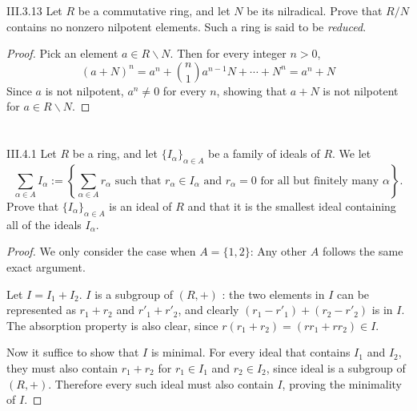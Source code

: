 \begin{problem}{III.3.13}
Let $R$ be a commutative ring, and let $N$ be its nilradical. Prove that $R/N$ contains no nonzero nilpotent elements. Such a ring is said to be \emph{reduced}.
\end{problem}
\begin{proof}
Pick an element $a \in R \backslash N$. Then for every integer $n > 0$,
\[
(a + N)^n = a^n + \binom{n}{1} a^{n-1} N + \cdots + N^n = a^n + N
\]
Since $a$ is not nilpotent, $a^n \neq 0$ for every $n$, showing that $a + N$ is not nilpotent for $a \in R \backslash N$.
\end{proof}

\section{}
\begin{problem}{III.4.1}
Let $R$ be a ring, and let $\{I_\alpha\}_{\alpha \in A}$ be a family of ideals of $R$. We let
\[
\sum_{\alpha \in A} I_\alpha := \left\{ \sum_{\alpha \in A}r_\alpha \text{ such that } r_\alpha \in I_\alpha \text{ and } r_\alpha = 0 \text{ for all but finitely many } \alpha \right\}.
\]
Prove that $\{I_\alpha\}_{\alpha \in A}$ is an ideal of $R$ and that it is the smallest ideal containing all of the ideals $I_\alpha$.
\end{problem}
\begin{proof}
We only consider the case when $A = \{1,2\}$: Any other $A$ follows the same exact argument.

Let $I = I_1 + I_2$. $I$ is a subgroup of $(R,+)$ : the two elements in $I$ can be represented as $r_1 + r_2$ and $r'_1 + r'_2$, and clearly $(r_1 - r'_1) + (r_2 - r'_2)$ is in $I$. The absorption property is also clear, since $r (r_1 + r_2) = (rr_1 + rr_2) \in I$.

Now it suffice to show that $I$ is minimal. For every ideal that contains $I_1$ and $I_2$, they must also contain $r_1 + r_2$ for $r_1 \in I_1$ and $r_2 \in I_2$, since ideal is a subgroup of $(R,+)$. Therefore every such ideal must also contain $I$, proving the minimality of $I$.
\end{proof}

